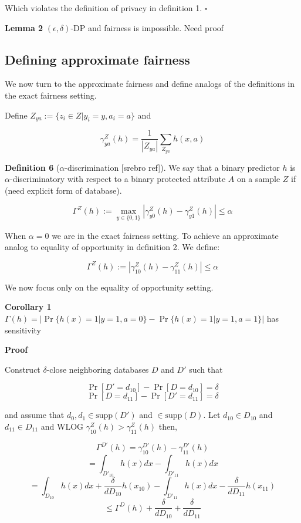 \documentclass[runningheads]{article}
\newcommand{\1}{\mathbbm{1}}
\theoremstyle{definition}
\begin{document}
Which violates the definition of privacy in definition 1. $\square$ 
\vspace{0.5cm}

{\bf Lemma 2} $(\epsilon, \delta)$-DP and fairness is impossible. Need proof


\subsection{Defining approximate fairness}
We now turn to the approximate fairness and define analogs of the definitions in the exact fairness setting. 

Define $Z_{ya} := \{z_i \in Z | y_i = y, a_i = a \}$ and

$$\gamma_{ya}^Z(h) = \frac{1}{|Z_{ya}|} \sum_{Z_{ya}} h(x,a)$$


{\bf Definition 6} ($\alpha$-discrimination [srebro ref]). We say that a binary predictor $h$ is $\alpha$-discriminatory with respect to a binary protected attribute $A$ on a sample $Z$ if (need explicit form of database).

$$\Gamma^Z(h) := \max_{y\in \{0,1\}}|\gamma_{y0}^Z(h) - \gamma_{y1}^Z(h)| \leq \alpha$$


When $\alpha = 0$ we are in the exact fairness setting. To achieve an approximate analog to equality of opportunity in definition 2. We define:

$$\Gamma^Z(h) := |\gamma_{10}^Z(h) - \gamma_{11}^Z(h)| \leq \alpha$$

We now focus only on the equality of opportunity setting.

{\bf Corollary 1} $\Gamma(h) = |\Pr\{h(x) = 1 | y=1, a =0\} - \Pr\{h(x) = 1 | y = 1, a = 1\}|$ has sensitivity 

{\bf Proof} 

Construct $\delta$-close neighboring databases $D$ and $D'$ such that

$$\Pr[D'=d_{10}] - \Pr[D=d_{10}] = \delta$$
$$\Pr[D=d_{11}] - \Pr[D'=d_{11}] = \delta$$



and assume that $d_0, d_1 \in \text{supp}(D')$ and $\in \text{supp}(D)$. Let $d_{10} \in D_{10}$ and $d_{11} \in D_{11}$ and WLOG $\gamma_{10}^Z(h) > \gamma_{11}^Z(h)$ then,

$$\Gamma^{D'}(h) = \gamma_{10}^{D'}(h) - \gamma_{11}^{D'}(h)$$
$$= \int_{D'_{10}}h(x)dx - \int_{D'_{11}}h(x)dx$$
$$= \int_{D_{10}}h(x)dx + \frac{\delta}{dD_{10}}h(x_{10}) - \int_{D'_{11}}h(x)dx - \frac{\delta}{dD_{11}}h(x_{11})$$
$$\leq \Gamma^{D}(h) + \frac{\delta}{dD_{10}} + \frac{\delta}{dD_{11}}$$
\end{document}
